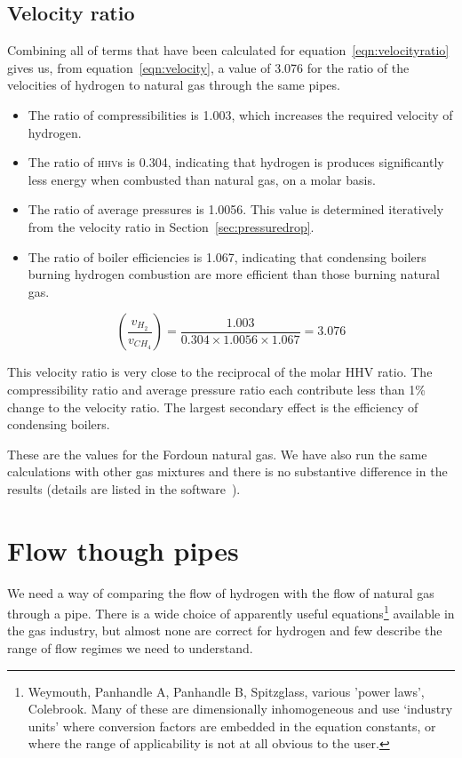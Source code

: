 \documentclass[5p]{elsarticle} %
\begin{document}
\subsection{Velocity ratio}
\label{sec:velocity}

Combining all of terms that have been calculated for equation~\eqref{eqn:velocityratio} gives us,  from equation~\eqref{eqn:velocity}, a value of 3.076 for the ratio of the velocities of hydrogen to natural gas through the same pipes.
\begin{itemize}
    \item The ratio of compressibilities is 1.003, which increases the required velocity of hydrogen.
    \item The ratio of \textsc{hhv}s is 0.304, indicating that hydrogen is produces significantly less energy when combusted than natural gas, on a molar basis.
    \item The ratio of average pressures is 1.0056. This value is determined iteratively from the velocity ratio in Section~\ref{sec:pressuredrop}.
    \item The ratio of boiler efficiencies is 1.067, indicating that condensing boilers burning hydrogen combustion are more efficient than those burning natural gas. 
\end{itemize}

\begin{equation}
\label{eqn:velocity}
    \left(\frac{v_{H_2}}{v_{CH_4}}\right) = \frac{1.003}{0.304 \times  1.0056 \times 1.067} = \mathbf{3.076}
\end{equation}

This velocity ratio is very close to the reciprocal of the molar HHV ratio.
The compressibility ratio and average pressure ratio each contribute less than 1\% change to the velocity ratio.
The largest secondary effect is the efficiency of condensing boilers. 

These are the values for the Fordoun natural gas. 
We have also run the same calculations with other gas mixtures and there is no substantive difference in the results (details are listed in the software~\cite{Sargents_github}).

\section{Flow though pipes}
\label{sec:flow}

We need a way of comparing the flow of hydrogen with the flow of natural gas through a pipe. 
There is a wide choice of apparently useful equations\footnote{
Weymouth, Panhandle A, Panhandle B, Spitzglass, various 'power laws', Colebrook\citep{Allen2007, She2012}. Many of these are dimensionally inhomogeneous and use `industry units' where conversion factors are embedded in the equation constants, or where the range of applicability is not at all obvious to the user.
}
available in the gas industry, but almost none are correct for hydrogen and few describe the range of flow regimes we need to understand.
\end{document}
